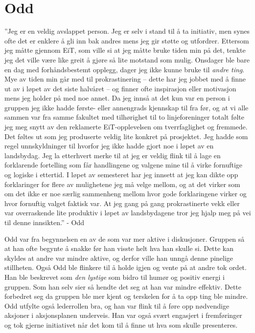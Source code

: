 \section{Odd}
''Jeg er en veldig avslappet person.
Jeg er selv i stand til å ta initiativ, men synes ofte det er enklere å gli inn bak andres mens jeg gir støtte og utfordrer.
Ettersom jeg måtte gjennom EiT, som ville si at jeg måtte bruke tiden min på det, tenkte jeg det ville være like greit å gjøre så lite motstand som mulig.
Onsdager ble bare en dag med forhåndsbestemt opplegg, dager jeg ikke kunne bruke til \textit{andre ting}.
Mye av tiden min går med til prokrastinering -- dette har jeg jobbet med å finne ut av i løpet av det siste halvåret -- og finner ofte inspirasjon eller motivasjon mens jeg holder på med noe annet.
Da jeg innså at det kun var en person i gruppen jeg ikke hadde første- eller annengrads kjennskap til fra før, og at vi alle sammen var fra samme fakultet med tilhørighet til to linjeforeninger totalt følte jeg meg snytt av den reklamerte EiT-opplevelsen om tverrfaglighet og fremmede.
Det føltes ut som jeg produserte veldig lite konkret på prosjektet.
Jeg hadde som regel unnskyldninger til hvorfor jeg ikke hadde gjort noe i løpet av en landsbydag.
Jeg la etterhvert merke til at jeg er veldig flink til å lage en forklarende fortelling som får handlingene og valgene mine til å virke fornuftige og logiske i ettertid.
I løpet av semesteret har jeg innsett at jeg kan dikte opp forklaringer for flere av mulighetene jeg må velge mellom, og at det virker som om det ikke er noe særlig sammenheng mellom hvor gode forklaringene virker og hvor fornuftig valget faktisk var.
At jeg gang på gang prokrastinerte vekk eller var overraskende lite produktiv i løpet av landsbydagene tror jeg hjalp meg på vei til denne innsikten.''
\hfill - Odd
\vspace{\secspace}

Odd var fra begynnelsen en av de som var mer aktive i diskusjoner. 
Gruppen så at han ofte begynte å snakke før han visste helt hva han skulle si. 
Dette kan skyldes at andre var mindre aktive, og derfor ville han unngå denne pinelige stillheten. 
Også Odd ble flinkere til å holde igjen og vente på at andre tok ordet. 
Han ble beskrevet som \textit{den lystige} som bidro til humør og positiv energi i gruppen. 
Som han selv sier så hendte det seg at han var mindre effektiv. 
Dette forbedret seg da gruppen ble mer kjent og terskelen for å ta opp ting ble mindre. 
Odd utfylte også lederrollen bra, og han var flink til å føre opp nødvendige aksjoner i aksjonsplanen underveis. 
Han var også svært engasjert i fremføringer og tok gjerne initiativet når det kom til å finne ut hva som skulle presenteres. 